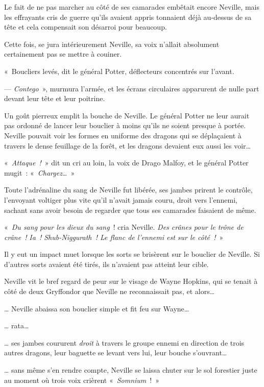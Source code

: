 Le fait de ne pas marcher au côté de ses camarades embêtait encore Neville, mais les effrayants cris de guerre qu'ils avaient appris tonnaient déjà au-dessus de sa tête et cela compensait son désarroi pour beaucoup.

Cette fois, se jura intérieurement Neville, sa voix n'allait absolument certainement pas se mettre à couiner.

«~Boucliers levés, dit le général Potter, déflecteurs concentrés sur l'avant.

--- \emph{Contego}~», murmura l'armée, et les écrans circulaires apparurent de nulle part devant leur tête et leur poitrine.

Un goût pierreux emplit la bouche de Neville.
Le général Potter ne leur aurait pas ordonné de lancer leur bouclier à moins qu'ils ne soient presque à portée.
Neville pouvait voir les formes en uniforme des dragons qui se déplaçaient à travers le dense feuillage de la forêt, et les dragons devaient eux aussi les voir…

«~\emph{Attaque~!}~» dit un cri au loin, la voix de Drago Malfoy, et le général Potter mugit~: «~\emph{Chargez…}~»

Toute l'adrénaline du sang de Neville fut libérée, ses jambes prirent le contrôle, l'envoyant voltiger plus vite qu'il n'avait jamais couru, droit vers l'ennemi, sachant sans avoir besoin de regarder que tous ses camarades faisaient de même.

«~\emph{Du sang pour les dieux du sang}~! cria Neville.
\emph{Des crânes pour le trône de crâne~!} \emph{Ia~!
Shub-Niggurath~!
Le flanc de l'ennemi est sur le côté~!}~»

Il y eut un impact muet lorsque les sorts se brisèrent sur le bouclier de Neville.
Si d'autres sorts avaient été tirés, ils n'avaient pas atteint leur cible.

Neville vit le bref regard de peur sur le visage de Wayne Hopkins, qui se tenait à côté de deux Gryffondor que Neville ne reconnaissait pas, et alors…

… Neville abaissa son bouclier simple et fit feu sur Wayne…

… rata…

… ses jambes coururent \emph{droit} à travers le groupe ennemi en direction de trois autres dragons, leur baguette se levant vers lui, leur bouche s'ouvrant…

… sans même s'en rendre compte, Neville se laissa chuter sur le sol forestier juste au moment où trois voix crièrent «~\emph{Somnium}~!~»

